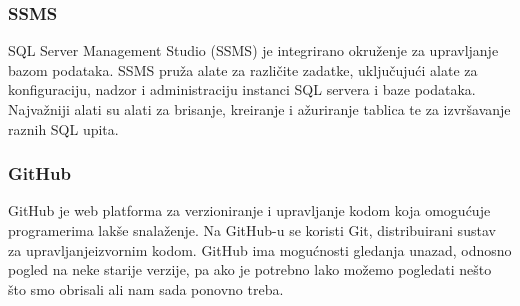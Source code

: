 \documentclass[diplomskirad]{fer}
\begin{document}
\subsubsection{SSMS}
SQL Server Management Studio (SSMS) je integrirano okruženje za upravljanje bazom podataka. SSMS pruža alate za različite zadatke, uključujući alate za konfiguraciju, nadzor i administraciju instanci SQL servera i baze podataka. Najvažniji alati su alati za brisanje, kreiranje i ažuriranje tablica te za izvršavanje raznih SQL upita. \cite{SSMS}
\subsubsection{GitHub}
GitHub je web platforma za verzioniranje i upravljanje kodom koja omogućuje programerima lakše snalaženje. Na GitHub-u se koristi Git, distribuirani sustav za upravljanjeizvornim kodom. GitHub ima mogućnosti gledanja unazad, odnosno pogled na neke starije verzije, pa ako je potrebno lako možemo pogledati nešto što smo obrisali ali nam sada ponovno treba. \cite{GIT}

\label{pog:glavni_dio}






\end{document}
